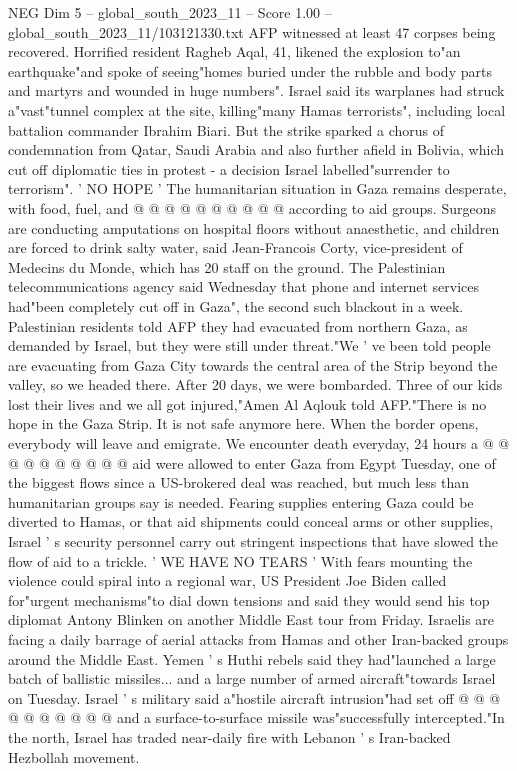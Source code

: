 \begin{textsample}{NEG Dim 5 – global\_south\_2023\_11 – Score 1.00 – global\_south\_2023\_11/103121330.txt}
AFP witnessed at least 47 corpses being recovered.
Horrified resident Ragheb Aqal, 41, likened the explosion to"an earthquake"and spoke of seeing"homes buried under the rubble and body parts and martyrs and wounded in huge numbers".
Israel said its warplanes had struck a"vast"tunnel complex at the site, killing"many Hamas terrorists", including local battalion commander Ibrahim Biari.
But the strike sparked a chorus of condemnation from Qatar, Saudi Arabia and also further afield in Bolivia, which cut off diplomatic ties in protest - a decision Israel labelled"surrender to terrorism". ' NO HOPE ' The humanitarian situation in Gaza remains desperate, with food, fuel, and @ @ @ @ @ @ @ @ @ @ according to aid groups.
Surgeons are conducting amputations on hospital floors without anaesthetic, and children are forced to drink salty water, said Jean-Francois Corty, vice-president of Medecins du Monde, which has 20 staff on the ground.
The Palestinian telecommunications agency said Wednesday that phone and internet services had"been completely cut off in Gaza", the second such blackout in a week.
Palestinian residents told AFP they had evacuated from northern Gaza, as demanded by Israel, but they were still under threat."We ' ve been told people are evacuating from Gaza City towards the central area of the Strip beyond the valley, so we headed there.
After 20 days, we were bombarded.
Three of our kids lost their lives and we all got injured,"Amen Al Aqlouk told AFP."There is no hope in the Gaza Strip.
It is not safe anymore here.
When the border opens, everybody will leave and emigrate.
We encounter death everyday, 24 hours a @ @ @ @ @ @ @ @ @ @ aid were allowed to enter Gaza from Egypt Tuesday, one of the biggest flows since a US-brokered deal was reached, but much less than humanitarian groups say is needed.
Fearing supplies entering Gaza could be diverted to Hamas, or that aid shipments could conceal arms or other supplies, Israel ' s security personnel carry out stringent inspections that have slowed the flow of aid to a trickle. ' WE HAVE NO TEARS ' With fears mounting the violence could spiral into a regional war, US President Joe Biden called for"urgent mechanisms"to dial down tensions and said they would send his top diplomat Antony Blinken on another Middle East tour from Friday.
Israelis are facing a daily barrage of aerial attacks from Hamas and other Iran-backed groups around the Middle East.
Yemen ' s Huthi rebels said they had"launched a large batch of ballistic missiles... and a large number of armed aircraft"towards Israel on Tuesday.
Israel ' s military said a"hostile aircraft intrusion"had set off @ @ @ @ @ @ @ @ @ @ and a surface-to-surface missile was"successfully intercepted."In the north, Israel has traded near-daily fire with Lebanon ' s Iran-backed Hezbollah movement.

\end{textsample}
